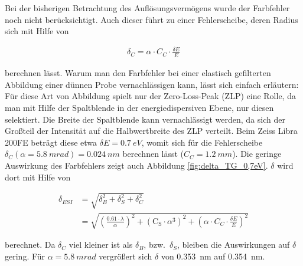 \documentclass[
	paper=a4,				%
	twoside=true,			%
	BCOR=6mm,				%
	fontsize=12pt,			%
	pagesize=auto,			%
	numbers=noenddot,		%
	bibliography=totoc,		%
	draft=false
]{scrartcl}
\begin{document}
Bei der bisherigen Betrachtung des Auflösungsvermögens wurde der Farbfehler noch nicht berücksichtigt. Auch dieser führt zu einer Fehlerscheibe, deren Radius sich mit Hilfe von

\begin{align}
\delta_C = \alpha \cdot C_C \cdot \frac{\delta E}{E} \label{eq:delta_C}
\end{align}

berechnen lässt. Warum man den Farbfehler bei einer elastisch gefilterten Abbildung einer dünnen Probe vernachlässigen kann, lässt sich einfach erläutern: Für diese Art von Abbildung spielt nur der Zero-Loss-Peak (ZLP) eine Rolle, da man mit Hilfe der Spaltblende in der energiedispersiven Ebene, nur diesen selektiert. Die Breite der Spaltblende kann vernachlässigt werden, da sich der Großteil der Intensität auf die Halbwertbreite des ZLP verteilt. Beim Zeiss Libra 200FE beträgt diese etwa $\delta E=\SI{0,7}{eV}$, womit sich für die Fehlerscheibe $\delta_C(\alpha = \SI{5,8}{mrad})=\SI{0,024}{nm}$ berechnen lässt ($C_C = \SI{1,2}{mm}$). Die geringe Auswirkung des Farbfehlers zeigt auch Abbildung \ref{fig:delta_TG_0,7eV}. $\delta$ wird dort mit Hilfe von

\begin{align}
\delta_{ESI} &= \sqrt{\delta_B^2 + \delta_S^2 + \delta_C^2} \\
&=\sqrt{\left(\frac{\num{0,61}\cdot\lambda}{\alpha}\right)^2 + \left(\text{C}_\text{S}\cdot\alpha^3\right)^2 + \left(\alpha \cdot C_C \cdot \frac{\delta E}{E}\right)^2} \label{eq:delta_ESI}
\end{align}

berechnet. Da $\delta_C$ viel kleiner ist als $\delta_B$, bzw.\ $\delta_S$, bleiben die Auswirkungen auf $\delta$ gering. Für $\alpha=\SI{5,8}{mrad}$ vergrößert sich $\delta$ von \SI{0,353}{nm} auf \SI{0,354}{nm}.
\end{document}
